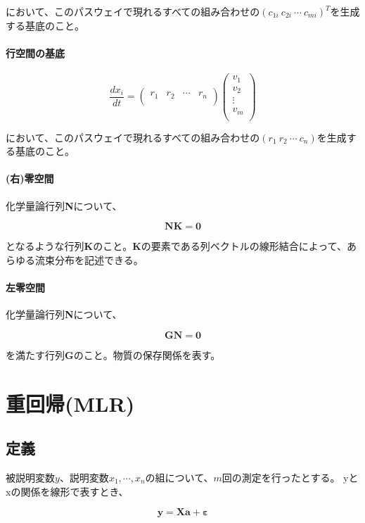 において、このパスウェイで現れるすべての組み合わせの\((c_{1i} \ c_{2i} \ \cdots \ c_{mi})^T\)を生成する基底のこと。

\paragraph{行空間の基底}
\[
\frac{dx_i}{dt} 
= 
\left(
\begin{array}{cccc}
r_1 & r_2 & \cdots & r_n \\
\end{array}
\right)
\left(
\begin{array}{c}
v_1 \\
v_2 \\
\vdots \\
v_m \\
\end{array}
\right)
\]

において、このパスウェイで現れるすべての組み合わせの\((r_1 \ r_2 \ \cdots \ c_n)\)を生成する基底のこと。

\paragraph{(右)零空間}
化学量論行列{\bf N}について、

\[{\mathbf N}{\mathbf K} = {\mathbf 0}\]

となるような行列{\bf K}のこと。{\bf K}の要素である列ベクトルの線形結合によって、あらゆる流束分布を記述できる。

\paragraph{左零空間}
化学量論行列{\bf N}について、

\[{\mathbf G}{\mathbf N} = {\mathbf 0}\]

を満たす行列{\bf G}のこと。物質の保存関係を表す。

\section{重回帰(MLR)}
\subsection{定義}
被説明変数\(y\)、説明変数\(x_1,\cdots , x_n\)の組について、\(m\)回の測定を行ったとする。
yとxの関係を線形で表すとき、

\[{\mathbf y} = {\mathbf X}{\mathbf a} + {\mathbf \varepsilon}\]


